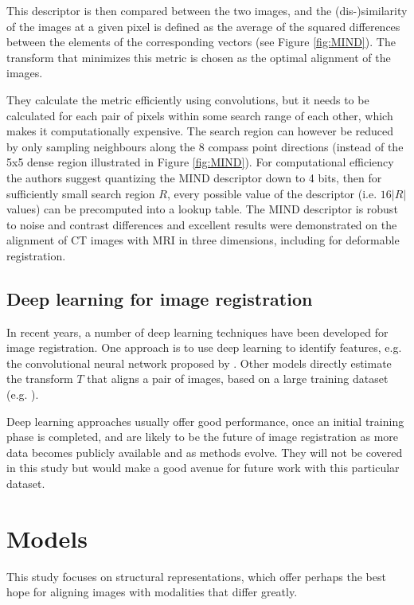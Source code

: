 \documentclass{report}
\begin{document}
This descriptor is then compared between the two images, and the (dis-)similarity of the images at a given pixel is defined as the average of the squared differences between the elements of the corresponding vectors (see Figure \ref{fig:MIND}). The transform that minimizes this metric is chosen as the optimal alignment of the images.

They calculate the metric efficiently using convolutions, but it needs to be calculated for each pair of pixels within some search range of each other, which makes it computationally expensive. The search region can however be reduced by only sampling neighbours along the 8 compass point directions (instead of the 5x5 dense region illustrated in Figure \ref{fig:MIND}). For computational efficiency the authors suggest quantizing the MIND descriptor down to 4 bits, then for sufficiently small search region $R$, every possible value of the descriptor (i.e. $16|R|$ values) can be precomputed into a lookup table. The MIND descriptor is robust to noise and contrast differences and excellent results were demonstrated on the alignment of CT images with MRI in three dimensions, including for deformable registration.



\section{Deep learning for image registration}
In recent years, a number of deep learning techniques have been developed for image registration. One approach is to use deep learning to identify features, e.g. the convolutional neural network proposed by \cite{dosovitskiy2015discriminative}. Other models directly estimate the transform $T$ that aligns a pair of images, based on a large training dataset (e.g. \cite{detone2016deep}).

Deep learning approaches usually offer good performance, once an initial training phase is completed, and are likely to be the future of image registration as more data becomes publicly available and as methods evolve. They will not be covered in this study but would make a good avenue for future work with this particular dataset.

\chapter{Models}
\label{sec:models}
This study focuses on structural representations, which offer perhaps the best hope for aligning images with modalities that differ greatly. %
\end{document}
